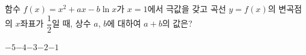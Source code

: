 함수 $f(x)=x^2+ax-b\ln x$가 $x=1$에서 극값을 갖고 곡선 $y=f(x)$의 변곡점의 $x$좌표가 $\dfrac{1}{2}$일 때, 상수 $a$, $b$에 대하여 $a+b$의 값은?
\begin{choices32}{$-5$}{$-4$}{$-3$}{$-2$}{$-1$}\end{choices32}
